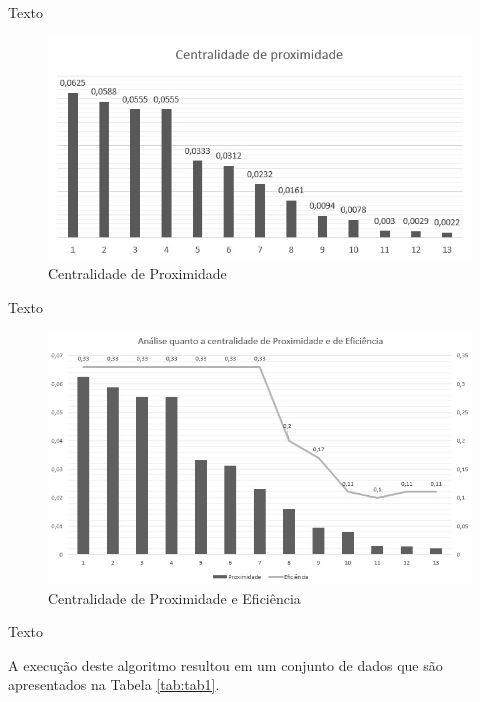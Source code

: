 \documentclass[12pt]{article}
\begin{document}
Texto
\begin{figure}[htp]
	\centering
	\includegraphics[scale=0.75]{Imagens/proximidade}
	\caption{Centralidade de Proximidade}
	\label{fig:fig4}
\end{figure}
Texto
\begin{figure}[htp]
	\centering
	\includegraphics[scale=0.70]{Imagens/ProximidadeEficiencia}
	\caption{Centralidade de Proximidade e Eficiência}
	\label{fig:fig4}
\end{figure}
Texto

A execução deste algoritmo resultou em um conjunto de dados que são apresentados na Tabela \ref{tab:tab1}. 
\end{document}

